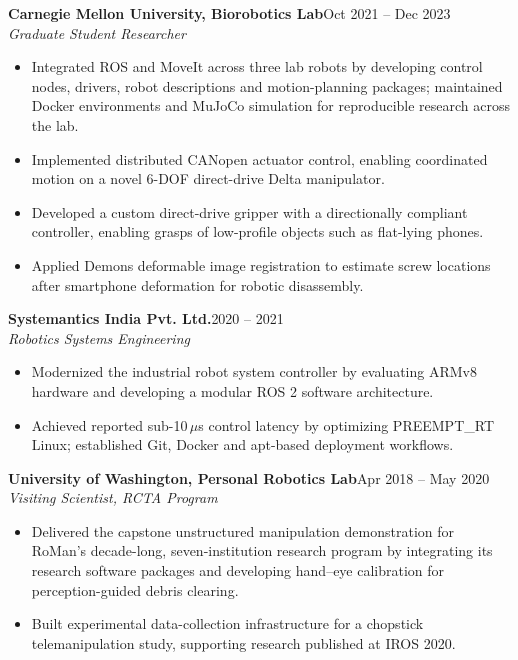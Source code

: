 \documentclass[11pt,a4paper]{article}
\newcommand{\role}[3]{%
  \Needspace{6\baselineskip}%
  \textbf{#1}\hfill #3\\
  \textit{#2}\par
}
\begin{document}
\role{Carnegie Mellon University, Biorobotics Lab}{Graduate Student Researcher}{Oct 2021 -- Dec 2023}
\begin{itemize}
  \item Integrated ROS and MoveIt across three lab robots by developing
  control nodes, drivers, robot descriptions and motion-planning packages;
  maintained Docker environments and MuJoCo simulation for reproducible
  research across the lab.
  \item Implemented distributed CANopen actuator control, enabling
  coordinated motion on a novel 6-DOF direct-drive Delta manipulator.
  \item Developed a custom direct-drive gripper with a directionally compliant
  controller, enabling grasps of low-profile objects such as flat-lying phones.
  \item Applied Demons deformable image registration to estimate screw
  locations after smartphone deformation for robotic disassembly.
\end{itemize}

\role{Systemantics India Pvt. Ltd.}{Robotics Systems Engineering}{2020 -- 2021}
\begin{itemize}
  \item Modernized the industrial robot system controller by evaluating
  ARMv8 hardware and developing a modular ROS 2 software architecture.
  \item Achieved reported sub-10\,$\mu$s control latency by optimizing
  PREEMPT\_RT Linux; established Git, Docker and apt-based deployment workflows.
\end{itemize}

\role{University of Washington, Personal Robotics Lab}{Visiting Scientist, RCTA Program}{Apr 2018 -- May 2020}
\begin{itemize}
  \item Delivered the capstone unstructured manipulation demonstration
  for RoMan's decade-long, seven-institution research program by
  integrating its research software packages and developing hand--eye
  calibration for perception-guided debris clearing.
  \item Built experimental data-collection infrastructure for a
  chopstick telemanipulation study, supporting research published at IROS 2020.
\end{itemize}

\newpage
\end{document}
